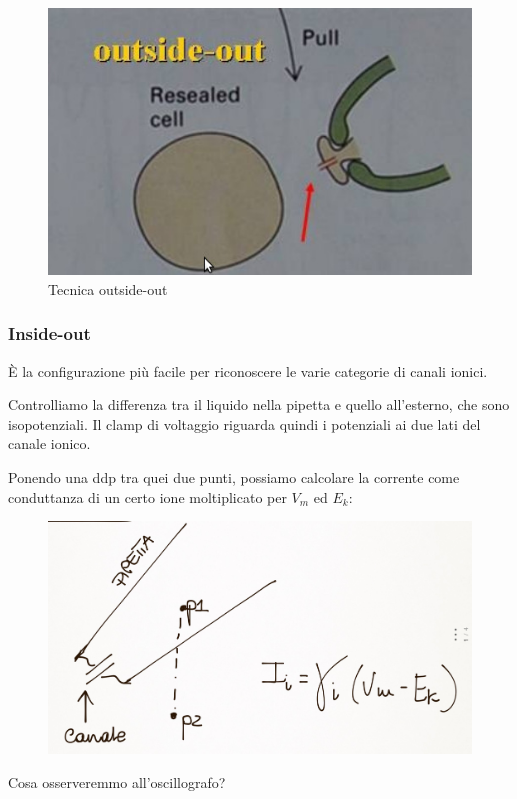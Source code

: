 \documentclass[a4paper,12pt]{article}
\begin{document}
\begin{figure}[H]
\centering
\includegraphics[scale=0.35]{immagine/out.jpg}
\caption{Tecnica outside-out}
\end{figure}

\subsubsection{Inside-out}
È la configurazione più facile per riconoscere le varie categorie di canali ionici.

Controlliamo la differenza tra il liquido nella pipetta e quello all'esterno, che sono isopotenziali. Il clamp di voltaggio riguarda quindi i potenziali ai due lati del canale ionico.

Ponendo una ddp tra quei due punti, possiamo calcolare la corrente come conduttanza di un certo ione moltiplicato per $V_{m}$ ed $E_{k}$:
\begin{figure}[H]
\centering
\includegraphics[scale=0.1]{immagine/1.jpg}
\end{figure}
Cosa osserveremmo all'oscillografo?
\end{document}
